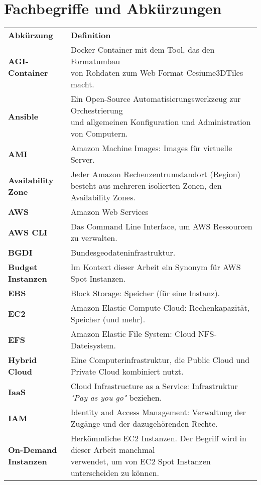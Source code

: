 \section{Fachbegriffe und Abkürzungen}
\begin{table}[!htbp]
\begin{tabular}{p{}p{}}
    \textbf{Abkürzung} & \textbf{Definition}\\
    \textbf{AGI-Container} & \makecell[l]{Docker Container mit dem Tool, das den Formatumbau\\ von Rohdaten zum Web Format Cesiume3DTiles macht.}\\
    \textbf{Ansible} & \makecell[l]{Ein Open-Source Automatisierungswerkzeug zur Orchestrierung\\ und allgemeinen Konfiguration und Administration von Computern.}\\
    \textbf{AMI} & Amazon Machine Images: Images für virtuelle Server.\\
    \textbf{Availability Zone} & \makecell[l]{Jeder Amazon Rechenzentrumstandort (Region)\\
    besteht aus mehreren isolierten Zonen, den Availability Zones.}\\
    \textbf{AWS} & Amazon Web Services\\
    \textbf{AWS CLI} & Das Command Line Interface, um AWS Ressourcen zu verwalten.\\
    \textbf{BGDI} & Bundesgeodateninfrastruktur.\\
    \textbf{Budget Instanzen} & Im Kontext dieser Arbeit ein Synonym für AWS Spot Instanzen.\\
    \textbf{EBS} & Block Storage: Speicher (für eine Instanz).\\
    \textbf{EC2} & Amazon Elastic Compute Cloud: Rechenkapazität, Speicher (und mehr).\\
    \textbf{EFS} & Amazon Elastic File System: Cloud NFS-Dateisystem.\\
    \textbf{Hybrid Cloud} & Eine Computerinfrastruktur, die Public Cloud und Private Cloud kombiniert nutzt.\\
    \textbf{IaaS} & Cloud Infrastructure as a Service: Infrastruktur \emph{"Pay as you go"} beziehen.\\
    \textbf{IAM} & Identity and Access Management: Verwaltung der Zugänge und der dazugehörenden Rechte.\\
    \makecell[l]{\textbf{On-Demand}\\ \textbf{Instanzen}} & \makecell[l]{Herkömmliche EC2 Instanzen. Der Begriff wird in dieser Arbeit manchmal\\ verwendet, um von EC2 Spot Instanzen unterscheiden zu können.}\\

\end{tabular}
\end{table}

